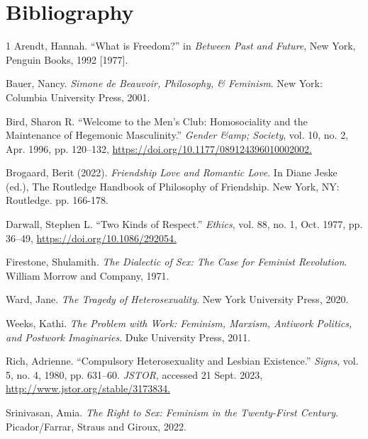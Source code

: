 \newpage  
\section*{Bibliography}


\begin{hangparas}{\hangingindent}{1}
Arendt, Hannah. ``What is Freedom?'' in \emph{Between Past and Future},
New York, Penguin Books, 1992 [1977].

Bauer, Nancy. \emph{Simone de Beauvoir, Philosophy, \& Feminism}. New
York: Columbia University Press, 2001.

Bird, Sharon R. ``Welcome to the Men's Club: Homosociality and the
Maintenance of Hegemonic Masculinity.'' \emph{Gender \&amp; Society}, vol. 10, no. 2, Apr. 1996, pp. 120--132,
\newline
\url{https://doi.org/10.1177/089124396010002002.}

Brogaard, Berit (2022). \emph{Friendship Love and Romantic Love}. In
Diane Jeske (ed.), The Routledge Handbook of Philosophy of Friendship. New York, NY: Routledge. pp. 166-178.

Darwall, Stephen L. ``Two Kinds of Respect.'' \emph{Ethics}, vol. 88,
no. 1, Oct. 1977, pp. 36--49,
\newline
\url{https://doi.org/10.1086/292054.}

Firestone, Shulamith. \emph{The Dialectic of Sex: The Case for Feminist
Revolution}. William Morrow and Company, 1971.

Ward, Jane. \emph{The Tragedy of Heterosexuality}. New York University
Press, 2020.

Weeks, Kathi. \emph{The Problem with Work: Feminism, Marxism, Antiwork
Politics, and Postwork Imaginaries}. Duke University Press, 2011.

Rich, Adrienne. ``Compulsory Heterosexuality and Lesbian Existence.''
\emph{Signs}, vol. 5, no. 4, 1980, pp. 631--60. \emph{JSTOR}, accessed 21 Sept. 2023,
\newline
\url{http://www.jstor.org/stable/3173834.} 

Srinivasan, Amia. \emph{The Right to Sex: Feminism in the Twenty-First
Century}. Picador/Farrar, Straus and Giroux, 2022.
\end{hangparas}